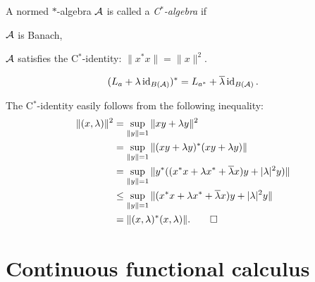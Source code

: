 \documentclass{../../large}
\begin{document}
\begin{prb}[C$^*$ identity]
A normed $*$-algebra $\cA$ is called a \emph{C$^*$-algebra} if
\begin{parts}
\item $\cA$ is Banach,
\item $\cA$ satisfies the C$^*$-identity: $\|x^*x\|=\|x\|^2$.
\end{parts}
\end{prb}


\begin{prb}
\[(L_a+\lambda\id_{B(\cA)})^*=L_{a^*}+\bar\lambda\id_{B(\cA)}.\]
\end{prb}
\begin{pf}
The C$^*$-identity easily follows from the following inequality:
\begin{align*}
\|(x,\lambda)\|^2&=\sup_{\|y\|=1}\|xy+\lambda y\|^2\\
&=\sup_{\|y\|=1}\|(xy+\lambda y)^*(xy+\lambda y)\|\\
&=\sup_{\|y\|=1}\|y^*((x^*x+\lambda x^*+\bar\lambda x)y+|\lambda|^2y)\|\\
&\le\sup_{\|y\|=1}\|(x^*x+\lambda x^*+\bar\lambda x)y+|\lambda|^2y\|\\
&=\|(x,\lambda)^*(x,\lambda)\|.\qedhere
\end{align*}
\end{pf}





\section{Continuous functional calculus}
\end{document}
